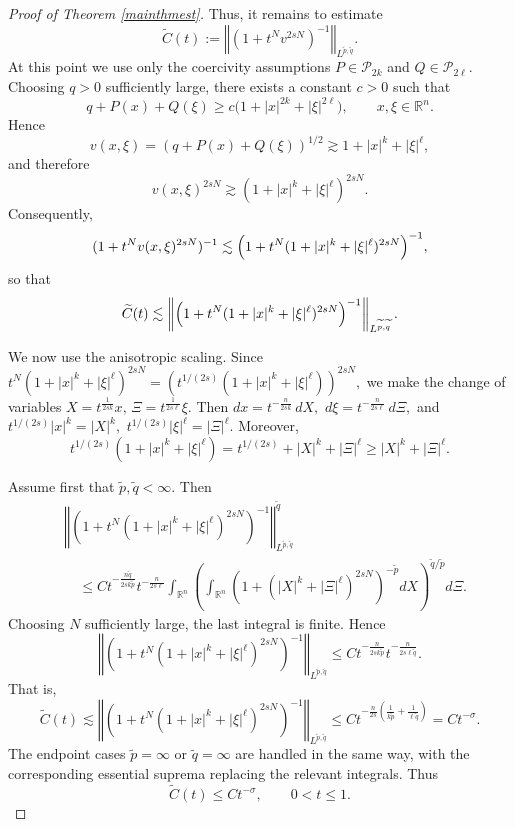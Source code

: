 \documentclass[12pt, reqno]{amsart}
\theoremstyle{definition}
\theoremstyle{remark}
\numberwithin{equation}{section}
\begin{document}
\begin{proof}[Proof of Theorem \ref{mainthmest}]
Thus, it remains to estimate \[ \widetilde C(t) := \left\Vert (1+t^N v^{2sN})^{-1} \right\Vert_{L^{\widetilde p,\widetilde q}}. \] At this point we use only the coercivity assumptions \( P\in\mathcal P_{2k} \) and \( Q\in\mathcal P_{2\ell}. \) Choosing \(q>0\) sufficiently large, there exists a constant \(c>0\) such that \[ q+P(x)+Q(\xi) \geq c\bigl(1+|x|^{2k}+|\xi|^{2\ell}\bigr), \qquad x,\xi\in\mathbb R^n. \] Hence \[ v(x,\xi) = (q+P(x)+Q(\xi))^{1/2} \gtrsim 1+|x|^k+|\xi|^\ell, \] and therefore \[ v(x,\xi)^{2sN} \gtrsim (1+|x|^k+|\xi|^\ell)^{2sN}. \] Consequently, \[ (1+t^N v(x,\xi)^{2sN})^{-1} \lesssim \Bigl( 1+t^N(1+|x|^k+|\xi|^\ell)^{2sN} \Bigr)^{-1}, \] so that \[ \widetilde C(t) \lesssim \left\Vert \Bigl( 1+t^N(1+|x|^k+|\xi|^\ell)^{2sN} \Bigr)^{-1} \right\Vert_{L^{\widetilde p,\widetilde q}}. \]




We now use the anisotropic scaling. Since $t^N(1+|x|^k+|\xi|^\ell)^{2sN}
=
\left(
t^{1/(2s)}(1+|x|^k+|\xi|^\ell)
\right)^{2sN},$
we make the change of variables $X=t^{\frac1{2sk}}x,\,
\Xi=t^{\frac1{2s\ell}}\xi.$
Then $dx=t^{-\frac n{2sk}}\,dX,
\,\,
d\xi=t^{-\frac n{2s\ell}}\,d\Xi,$
and $t^{1/(2s)}|x|^k=|X|^k,
\,\,
t^{1/(2s)}|\xi|^\ell=|\Xi|^\ell.$
Moreover,
\[
t^{1/(2s)}
(1+|x|^k+|\xi|^\ell)
=
t^{1/(2s)}+|X|^k+|\Xi|^\ell
\geq
|X|^k+|\Xi|^\ell.
\]

Assume first that $\widetilde p,\widetilde q<\infty$. Then
\begin{align*}
&\left\Vert
\left(
1+t^N(1+|x|^k+|\xi|^\ell)^{2sN}
\right)^{-1}
\right\Vert_{L^{\widetilde p,\widetilde q}}^{\widetilde q}
\\
&\quad\leq
C
t^{-\frac{n\widetilde q}{2sk\widetilde p}}
t^{-\frac n{2s\ell}}
\int_{\mathbb{R}^n}
\left(
\int_{\mathbb{R}^n}
\left(
1+(|X|^k+|\Xi|^\ell)^{2sN}
\right)^{-\widetilde p}
dX
\right)^{\widetilde q/\widetilde p}
d\Xi.
\end{align*}
Choosing $N$ sufficiently large, the last integral is finite. Hence
\[
\left\Vert
\left(
1+t^N(1+|x|^k+|\xi|^\ell)^{2sN}
\right)^{-1}
\right\Vert_{L^{\widetilde p,\widetilde q}}
\leq
C
t^{-\frac n{2sk\widetilde p}}
t^{-\frac n{2s\ell\widetilde q}}.
\]
That is,
\[
\widetilde C(t) \lesssim \left\Vert
\left(
1+t^N(1+|x|^k+|\xi|^\ell)^{2sN}
\right)^{-1}
\right\Vert_{L^{\widetilde p,\widetilde q}}
\leq
C
t^{-\frac n{2s}
\left(
\frac1{k\widetilde p}
+
\frac1{\ell\widetilde q}
\right)}
=
Ct^{-\sigma}.
\]
The endpoint cases $\widetilde p=\infty$ or $\widetilde q=\infty$ are handled in the same way, with the corresponding essential suprema replacing the relevant integrals. Thus
\[
\widetilde C(t)\leq Ct^{-\sigma},
\qquad
0<t\leq 1.
\]


\end{proof}
\end{document}
